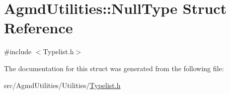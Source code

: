 \hypertarget{struct_agmd_utilities_1_1_null_type}{\section{Agmd\+Utilities\+:\+:Null\+Type Struct Reference}
\label{struct_agmd_utilities_1_1_null_type}
}


{\ttfamily \#include $<$Typelist.\+h$>$}



The documentation for this struct was generated from the following file\+:\begin{DoxyCompactItemize}
\item 
src/\+Agmd\+Utilities/\+Utilities/\hyperlink{_typelist_8h}{Typelist.\+h}\end{DoxyCompactItemize}
